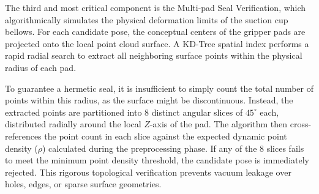 The third and most critical component is the Multi-pad Seal Verification, which algorithmically simulates the physical deformation limits of the suction cup bellows. For each candidate pose, the conceptual centers of the gripper pads are projected onto the local point cloud surface.  A KD-Tree spatial index performs a rapid radial search to extract all neighboring surface points within the physical radius of each pad.

To guarantee a hermetic seal, it is insufficient to simply count the total number of points within this radius, as the surface might be discontinuous. Instead, the extracted points are partitioned into 8 distinct angular slices of $45^\circ$ each, distributed radially around the local $Z$-axis of the pad. The algorithm then cross-references the point count in each slice against the expected dynamic point density ($\rho$) calculated during the preprocessing phase. If any of the 8 slices fails to meet the minimum point density threshold, the candidate pose is immediately rejected. This rigorous topological verification prevents vacuum leakage over holes, edges, or sparse surface geometries.
